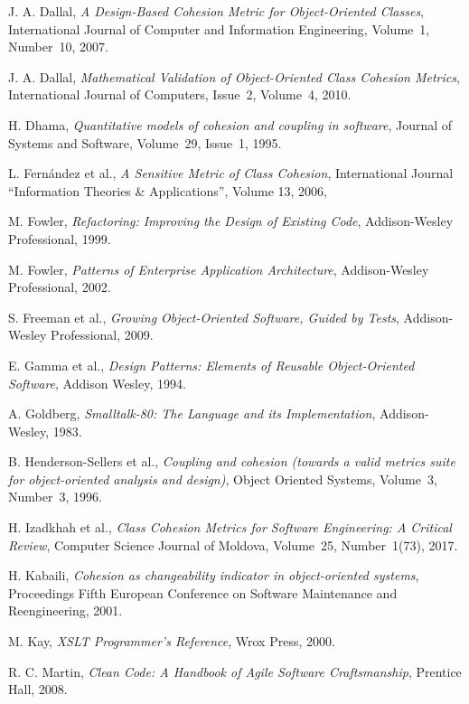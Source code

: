 \documentclass[conference]{IEEEtran}
\begin{document}
\begin{thebibliography}{}
{
J. A. Dallal,
\emph{A Design-Based Cohesion Metric for Object-Oriented Classes},
International Journal of Computer and Information Engineering,
Volume~1, Number~10, 2007.

J. A. Dallal,
\emph{Mathematical Validation of Object-Oriented Class Cohesion Metrics},
International Journal of Computers, Issue~2, Volume~4, 2010.

H. Dhama,
\emph{Quantitative models of cohesion and coupling in software},
Journal of Systems and Software,
Volume~29, Issue~1, 1995.

L. Fern\'andez et al.,
\emph{A Sensitive Metric of Class Cohesion},
International Journal ``Information Theories \& Applications'',
Volume 13, 2006,

M. Fowler,
\emph{Refactoring: Improving the Design of Existing Code},
Addison-Wesley Professional, 1999.

M. Fowler,
\emph{Patterns of Enterprise Application Architecture},
Addison-Wesley Professional, 2002.

S. Freeman et al.,
\emph{Growing Object-Oriented Software, Guided by Tests},
Addison-Wesley Professional, 2009.

E. Gamma et al.,
\emph{Design Patterns: Elements of Reusable Object-Oriented Software},
Addison Wesley, 1994.

A. Goldberg,
\emph{Smalltalk-80: The Language and its Implementation},
Addison-Wesley, 1983.

B. Henderson-Sellers et al.,
\emph{Coupling and cohesion (towards a valid metrics suite for object-oriented analysis and design)},
Object Oriented Systems, Volume~3, Number~3, 1996.

H. Izadkhah et al.,
\emph{Class Cohesion Metrics for Software Engineering: A Critical Review},
Computer Science Journal of Moldova, Volume~25, Number~1(73), 2017.

H. Kabaili,
\emph{Cohesion as changeability indicator in object-oriented systems},
Proceedings Fifth European Conference on Software Maintenance and Reengineering, 2001.

M. Kay,
\emph{XSLT Programmer's Reference},
Wrox Press, 2000.

R. C. Martin,
\emph{Clean Code: A Handbook of Agile Software Craftsmanship},
Prentice Hall, 2008.

}
\end{thebibliography}
\end{document}
